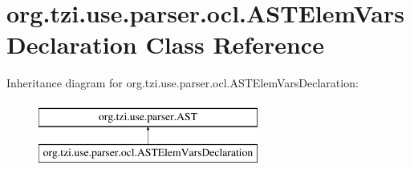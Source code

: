 \hypertarget{classorg_1_1tzi_1_1use_1_1parser_1_1ocl_1_1_a_s_t_elem_vars_declaration}{\section{org.\-tzi.\-use.\-parser.\-ocl.\-A\-S\-T\-Elem\-Vars\-Declaration Class Reference}
\label{classorg_1_1tzi_1_1use_1_1parser_1_1ocl_1_1_a_s_t_elem_vars_declaration}
}
Inheritance diagram for org.\-tzi.\-use.\-parser.\-ocl.\-A\-S\-T\-Elem\-Vars\-Declaration\-:\begin{figure}[H]
\begin{center}
\leavevmode
\includegraphics[height=2.000000cm]{classorg_1_1tzi_1_1use_1_1parser_1_1ocl_1_1_a_s_t_elem_vars_declaration}
\end{center}
\end{figure}
